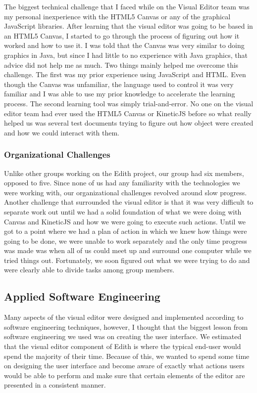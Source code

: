 \documentclass[a4paper]{article}
\begin{document}
The biggest technical challenge that I faced while on the Visual Editor team was my personal inexperience with the HTML5 Canvas or any of the graphical JavaScript libraries. After learning that the visual editor was going to be based in an HTML5 Canvas, I started to go through the process of figuring out how it worked and how to use it. I was told that the Canvas was very similar to doing graphics in Java, but since I had little to no experience with Java graphics, that advice did not help me as much. Two things mainly helped me overcome this challenge. The first was my prior experience using JavaScript and HTML. Even though the Canvas was unfamiliar, the language used to control it was very familiar and I was able to use my prior knowledge to accelerate the learning process. The second learning tool was simply trial-and-error. No one on the visual editor team had ever used the HTML5 Canvas or KineticJS before so what really helped us was several test documents trying to figure out how object were created and how we could interact with them. 

\subsubsection{Organizational Challenges}

Unlike other groups working on the Edith project, our group had six members, opposed to five. Since none of us had any familiarity with the technologies we were working with, our organizational challenges revolved around slow progress. Another challenge that surrounded the visual editor is that it was very difficult to separate work out until we had a solid foundation of what we were doing with Canvas and KineticJS and how we were going to execute such actions. Until we got to a point where we had a plan of action in which we knew how things were going to be done, we were unable to work separately and the only time progress was made was when all of us could meet up and surround one computer while we tried things out. Fortunately, we soon figured out what we were trying to do and were clearly able to divide tasks among group members.

\subsection{Applied Software Engineering}

Many aspects of the visual editor were designed and implemented according to software engineering techniques, however, I thought that the biggest lesson from software engineering we used was on creating the user interface. We estimated that the visual editor component of Edith is where the typical end-user would spend the majority of their time. Because of this, we wanted to spend some time on designing the user interface and become aware of exactly what actions users would be able to perform and make sure that certain elements of the editor are presented in a consistent manner.
\end{document}
